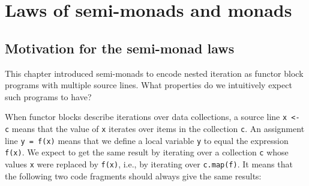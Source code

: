 \begin{comment}
some elementary step of computation that deals with some kind of context
together with a new value and we want this elementary step of the
computation to be usable under flatmap in other words the type of
this elementary step of the computation must be of the kind a to FB
where F is the function that is the type of the argument of want map
so systematically we demanded that the type was of that kind and that
allowed us straightforwardly to derive the types of these moments
you need to get used to these moments in order to be proficient with
them but I hope that this derivation kind of lifts the veil of mystery
from the question of why are the types of that\textsf{'}s chosen like this
and what is this context and they manipulate here are some exercises
for you to get more familiar with using walnuts and to implement simple
examples using set sequence future lists or try and state units as
well as implementing semi modded instances which means simply implementing
flatmap for certain type instructors that concludes part 1 of chapter
7
\end{comment}


\section{Laws of semi-monads and monads}

\subsection{Motivation for the semi-monad laws}

This chapter introduced semi-monads to encode nested iteration as
functor block programs with multiple source lines. What properties
do we intuitively expect such programs to have?

When functor blocks describe iterations over data collections, a source
line \lstinline!x <- c! means that the value of \lstinline!x! iterates
over items in the collection \lstinline!c!. An assignment line \lstinline!y = f(x)!
means that we define a local variable \lstinline!y! to equal the
expression \lstinline!f(x)!. We expect to get the same result by
iterating over a collection \lstinline!c! whose values \lstinline!x!
were replaced by \lstinline!f(x)!, i.e., by iterating over \lstinline!c.map(f)!.
It means that the following two code fragments should always give
the same results:

\vspace{0.3\baselineskip}

